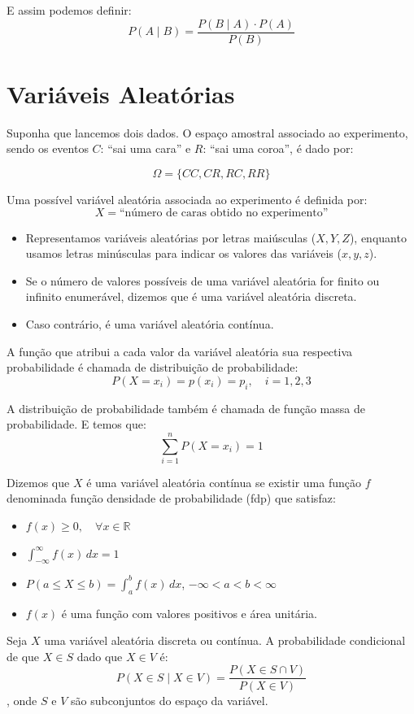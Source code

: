 \documentclass{article}
\begin{document}
E assim podemos definir:
    $$
    P(A \mid B) = \frac{P(B \mid A) \cdot P(A)}{P(B)}
    $$

\section{Variáveis Aleatórias}
Suponha que lancemos dois dados. O espaço amostral associado ao experimento, sendo os eventos $C$: ``sai uma cara'' e $R$: ``sai uma coroa'', é dado por:

$$
\Omega = \{CC, CR, RC, RR\}
$$

Uma possível variável aleatória associada ao experimento é definida por:
$$
X = \text{``número de caras obtido no experimento''}
$$

\begin{itemize}
    \item Representamos variáveis aleatórias por letras maiúsculas ($X, Y, Z$), enquanto usamos letras minúsculas para indicar os valores das variáveis ($x, y, z$).
    \item Se o número de valores possíveis de uma variável aleatória for finito ou infinito enumerável, dizemos que é uma variável aleatória discreta.
    \item Caso contrário, é uma variável aleatória contínua.
\end{itemize}

A função que atribui a cada valor da variável aleatória sua respectiva probabilidade é chamada de distribuição de probabilidade:
    $$
    P(X = x_i) = p(x_i) = p_i, \quad i = 1,2,3
    $$

A distribuição de probabilidade também é chamada de função massa de probabilidade. E temos que:
    $$
    \sum_{i=1}^{n} P(X = x_i) = 1
    $$

Dizemos que $X$ é uma variável aleatória contínua se existir uma função $f$ denominada função densidade de probabilidade (fdp) que satisfaz:
\begin{itemize}
    \item $f(x) \geq 0, \quad \forall x \in \mathbb{R}$
    \item $\int_{-\infty}^{\infty} f(x) \, dx = 1$
    \item $P(a \leq X \leq b) = \int_{a}^{b} f(x) \, dx
    $, $-\infty < a < b < \infty$
    \item $f(x)$ é uma função com valores positivos e área unitária.
\end{itemize}

Seja $X$ uma variável aleatória discreta ou contínua. A probabilidade condicional de que $X \in S$ dado que $X \in V$ é:
    $$
    P(X \in S \mid X \in V) = \frac{P(X \in S \cap V)}{P(X \in V)}
    $$,
onde $S$ e $V$ são subconjuntos do espaço da variável.
\end{document}
